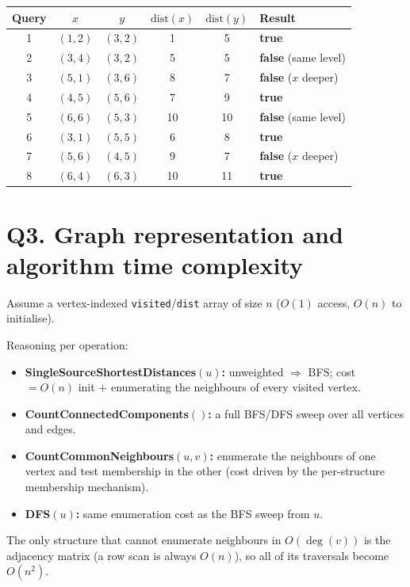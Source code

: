 \documentclass[11pt]{article}
\begin{document}
\begin{center}
\begin{tabular}{c c c c c l}
\toprule
\rowcolor{white}
Query & $x$ & $y$ & $\mathrm{dist}(x)$ & $\mathrm{dist}(y)$ & Result \\
\midrule
1 & $(1,2)$ & $(3,2)$ & 1  & 5  & \textbf{true} \\
2 & $(3,4)$ & $(3,2)$ & 5  & 5  & \textbf{false} (same level) \\
3 & $(5,1)$ & $(3,6)$ & 8  & 7  & \textbf{false} ($x$ deeper) \\
4 & $(4,5)$ & $(5,6)$ & 7  & 9  & \textbf{true} \\
5 & $(6,6)$ & $(5,3)$ & 10 & 10 & \textbf{false} (same level) \\
6 & $(3,1)$ & $(5,5)$ & 6  & 8  & \textbf{true} \\
7 & $(5,6)$ & $(4,5)$ & 9  & 7  & \textbf{false} ($x$ deeper) \\
8 & $(6,4)$ & $(6,3)$ & 10 & 11 & \textbf{true} \\
\bottomrule
\end{tabular}
\end{center}

\section*{Q3. Graph representation and algorithm time complexity}

Assume a vertex-indexed \texttt{visited}/\texttt{dist} array of size $n$ ($O(1)$
access, $O(n)$ to initialise).

Reasoning per operation:
\begin{itemize}[nosep]
  \item \textbf{SingleSourceShortestDistances$(u)$:} unweighted $\Rightarrow$ BFS; cost
    $=O(n)$ init $+$ enumerating the neighbours of every visited vertex.
  \item \textbf{CountConnectedComponents$()$:} a full BFS/DFS sweep over all vertices and edges.
  \item \textbf{CountCommonNeighbours$(u,v)$:} enumerate the neighbours of one vertex and
    test membership in the other (cost driven by the per-structure membership mechanism).
  \item \textbf{DFS$(u)$:} same enumeration cost as the BFS sweep from $u$.
\end{itemize}

The only structure that cannot enumerate neighbours in $O(\deg(v))$ is the adjacency
matrix (a row scan is always $O(n)$), so all of its traversals become $O(n^2)$.
\end{document}
